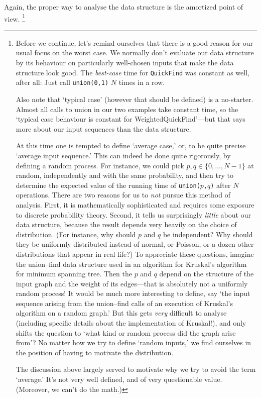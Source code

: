 \documentclass{tstextbook}
\begin{document}
Again, the proper way to analyse the data structure is the amortized point of view.
\footnote{
  Before we continue, let's remind ourselves that there is a good reason for our usual focus on the worst case.
  We normally don't evaluate our data structure by its behaviour on particularly well-chosen inputs that make the data structure look good. 
  The \emph{best-case} time for {\tt QuickFind} was constant as well, after all: Just call {\tt union(0,1)} $N$ times in a row.

  Also note that `typical case' (however that should be defined) is a no-starter.
  Almost all calls to union in our two examples take constant time, so the `typical case behaviour is constant for {WeightedQuickFind}'---but that says more about our input sequences than the data structure.

  At this time one is tempted to define `average case,' or, to be quite precise `average input sequence.'
  This can indeed be done quite rigorously, by defining a random process.
  For instance, we could pick $p,q\in\{0,\ldots, N-1\}$ at random, independently and with the same probability, and then try to determine the expected value of the running time of {\tt union($p$,$q$)} after $N$ operations.
  There are two reasons for us to \emph{not} pursue this method of analysis.
  First, it is mathematically sophisticated and requires some exposure to discrete probability theory.
  Second, it tells us surprisingly \emph{little} about our data structure, because the result depends very heavily on the choice of distribution.
  (For instance, why should $p$ and $q$ be independent? 
  Why should they be uniformly distributed instead of normal, or Poisson, or a dozen other distributions that appear in real life?)
  To appreciate these questions, imagine the union--find data structure used in an algorithm for Kruskal's algorithm for minimum spanning tree.
  Then the $p$ and $q$ depend on the structure of the input graph and the weight of its edges---that is absolutely not a uniformly random process!
  It would be much more interesting to define, say `the input sequence arising from the union--find calls of an execution of Kruskal's algorithm on a random graph.'
  But this gets \emph{very} difficult to analyse (including specific details about the implementation of Kruskal!), and only shifts the question to `what kind or random process did the graph arise from'?
  No matter how we try to define `random inputs,' we find ourselves in the position of having to motivate the distribution.
  
  The discussion above largely served to motivate why we try to avoid the term `average.'
  It's not very well defined, and of very questionable value.
  (Moreover, we can't do the math.)
}
\end{document}
